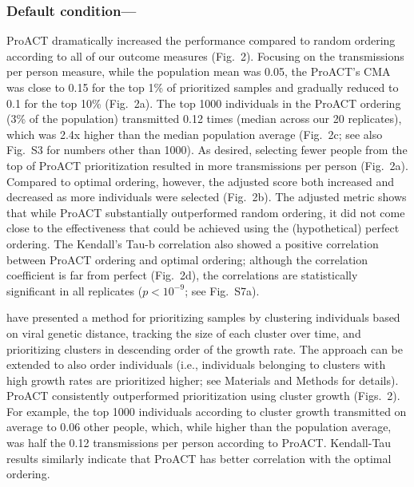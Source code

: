 \documentclass[oupdraft]{sysbio}
\newcommand{\TODO}[1]{{\color{red} #1} }
\newcommand{\PLWH}{sample\xspace}
\begin{document}
\subsubsection{Default condition---}
ProACT dramatically increased the performance compared to random ordering according to all of our outcome measures (Fig.~2).
Focusing on the transmissions per person measure, while the population mean was 0.05, the ProACT's CMA was close to 0.15 for the top 1\% of prioritized \PLWH{s} and gradually reduced to 0.1 for the top 10\% (Fig.~2a).
The top 1000 individuals in the ProACT ordering (3\% of the population)  transmitted {0.12} times (median across our 20 replicates), which was 2.4x  higher than the median population average (Fig.~2c; see also Fig.~S3 for numbers other than 1000).
As desired, selecting fewer people from the top of ProACT prioritization resulted in more transmissions per person (Fig.~2a).
Compared to optimal ordering, however, the adjusted score both increased and decreased as more individuals were selected (Fig.~2b). 
The adjusted metric shows that while ProACT substantially outperformed random ordering, it did not come close to the effectiveness that could be achieved using the (hypothetical) perfect ordering. 
The Kendall's Tau-b correlation also showed a positive correlation between ProACT ordering and optimal ordering;  although the correlation coefficient is far from perfect (Fig.~2d), the correlations are statistically significant in all replicates ($p<10^{-9}$; see Fig.~S7a).




\citet{Wertheim2018} have presented a method for prioritizing \PLWH{s} by clustering individuals based on viral genetic distance, tracking the size of each cluster over time, and prioritizing clusters in descending order of the growth rate. The approach can be extended to also order individuals (i.e., individuals belonging to clusters with high growth rates are prioritized higher; see Materials and Methods for details).
ProACT consistently outperformed prioritization using cluster growth  (Figs.~2).
For example, the top 1000 individuals according to cluster growth transmitted on average to 0.06 other people, which, while higher than the population average, was half the 0.12 transmissions per person according to ProACT. 
Kendall-Tau results similarly indicate that ProACT has better correlation with the optimal ordering.
\end{document}
